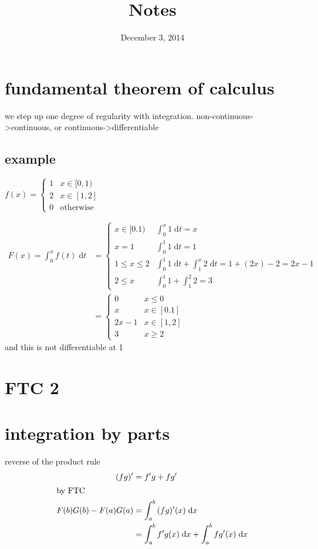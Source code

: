\documentclass[letterpaper]{article}
\begin{document}
\title{Notes}
\date{December 3, 2014}
\maketitle
\section*{fundamental theorem of calculus}
we step up one degree of regularity with integration. non-continuous->continuous, or continuous->differentiable

\subsection*{example}
$f(x)=\begin{cases}1&x\in[0,1)\\2&x\in[1,2]\\0&\text{otherwise}\end{cases}$

\begin{align*}
F(x)=\int_0^x{f(t)\;\mathrm{d}t}&=
\begin{cases}
  x\in[0.1)&\int_0^x{1\;\mathrm{d}t}=x\\
  x=1&\int_0^1{1\;\mathrm{d}t}=1\\
  1\le x\le2&\int_0^1{1\;\mathrm{d}t}+\int_1^x{2\;\mathrm{d}t}=1+(2x)-2=2x-1\\
  2\le x&\int_0^1{1}+\int_1^2{2}=3
\end{cases}\\
&=
\begin{cases}
  0&x\le0\\
  x&x\in[0.1]\\
  2x-1&x\in[1,2]\\
  3&x\ge2
\end{cases}
\end{align*}
and this is not differentiable at 1
\section*{FTC 2}
\section*{integration by parts}
reverse of the product rule
\begin{align*}
  (fg)'&=f'g+fg'\\
  \intertext{by FTC}
  F(b)G(b)-F(a)G(a)&=\int_a^b{(fg)'(x)\;\mathrm{d}x}\\
  &=\int_a^b{f'g(x)\;\mathrm{d}x}+\int_a^b{fg'(x)\;\mathrm{d}x}
\end{align*}
\end{document}
